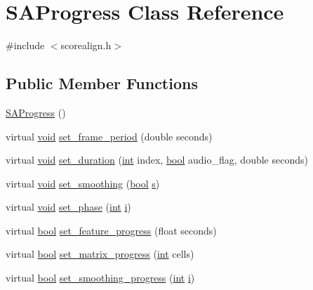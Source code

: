 \hypertarget{class_s_a_progress}{}\section{S\+A\+Progress Class Reference}
\label{class_s_a_progress}


{\ttfamily \#include $<$scorealign.\+h$>$}

\subsection*{Public Member Functions}
\begin{DoxyCompactItemize}
\item 
\hyperlink{class_s_a_progress_a520c8efff449ac32c39862399016b0c9}{S\+A\+Progress} ()
\item 
virtual \hyperlink{sound_8c_ae35f5844602719cf66324f4de2a658b3}{void} \hyperlink{class_s_a_progress_aa4665d7efb28713004b4ac0bd16f1628}{set\+\_\+frame\+\_\+period} (double seconds)
\item 
virtual \hyperlink{sound_8c_ae35f5844602719cf66324f4de2a658b3}{void} \hyperlink{class_s_a_progress_ae6a92d8858b245e7836956ae598ce4fa}{set\+\_\+duration} (\hyperlink{xmltok_8h_a5a0d4a5641ce434f1d23533f2b2e6653}{int} index, \hyperlink{mac_2config_2i386_2lib-src_2libsoxr_2soxr-config_8h_abb452686968e48b67397da5f97445f5b}{bool} audio\+\_\+flag, double seconds)
\item 
virtual \hyperlink{sound_8c_ae35f5844602719cf66324f4de2a658b3}{void} \hyperlink{class_s_a_progress_ad44ef2f6eb642d6d6f37519a112e2834}{set\+\_\+smoothing} (\hyperlink{mac_2config_2i386_2lib-src_2libsoxr_2soxr-config_8h_abb452686968e48b67397da5f97445f5b}{bool} \hyperlink{lib_2expat_8h_a755339d27872b13735c2cab829e47157}{s})
\item 
virtual \hyperlink{sound_8c_ae35f5844602719cf66324f4de2a658b3}{void} \hyperlink{class_s_a_progress_ab9551ace06ed5ba0688c14b5e7bc58b8}{set\+\_\+phase} (\hyperlink{xmltok_8h_a5a0d4a5641ce434f1d23533f2b2e6653}{int} \hyperlink{checksum_8c_ab80e330a3bc9e38c1297fe17381e92b4}{i})
\item 
virtual \hyperlink{mac_2config_2i386_2lib-src_2libsoxr_2soxr-config_8h_abb452686968e48b67397da5f97445f5b}{bool} \hyperlink{class_s_a_progress_a5aab11825cf5f00d917bb5e08f90fa9a}{set\+\_\+feature\+\_\+progress} (float seconds)
\item 
virtual \hyperlink{mac_2config_2i386_2lib-src_2libsoxr_2soxr-config_8h_abb452686968e48b67397da5f97445f5b}{bool} \hyperlink{class_s_a_progress_ae68de2b2270ffb2c16d33df598042184}{set\+\_\+matrix\+\_\+progress} (\hyperlink{xmltok_8h_a5a0d4a5641ce434f1d23533f2b2e6653}{int} cells)
\item 
virtual \hyperlink{mac_2config_2i386_2lib-src_2libsoxr_2soxr-config_8h_abb452686968e48b67397da5f97445f5b}{bool} \hyperlink{class_s_a_progress_a47a45e9cac9fb1228db986a1f8fcc790}{set\+\_\+smoothing\+\_\+progress} (\hyperlink{xmltok_8h_a5a0d4a5641ce434f1d23533f2b2e6653}{int} \hyperlink{checksum_8c_ab80e330a3bc9e38c1297fe17381e92b4}{i})
\end{DoxyCompactItemize}
